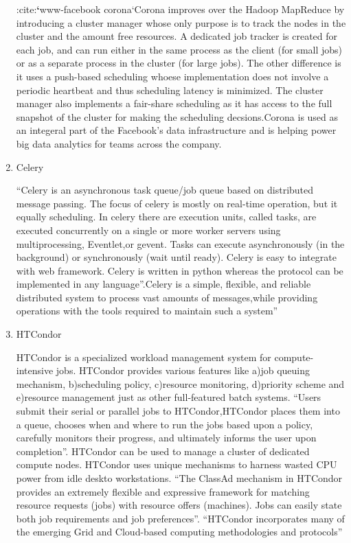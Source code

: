 \begin{enumerate}
:cite:{\color{red}\bfseries{}{}`}www-facebook corona{}`Corona improves over the Hadoop
MapReduce by introducing a cluster manager whose only purpose is
to track the nodes in the cluster and the amount free
resources. A dedicated job tracker is created for each job, and
can run either in the same process as the client (for small jobs)
or as a separate process in the cluster (for large jobs). The
other difference is it uses a push-based scheduling whoese
implementation does not involve a periodic heartbeat and thus
scheduling latency is minimized. The cluster manager also
implements a fair-share scheduling as it has access to the full
snapshot of the cluster for making the scheduling decsions.Corona
is used as an integeral part of the Facebook's data
infrastructure and is helping power big data analytics for teams
across the company.

\item {} 
Celery

``Celery is an asynchronous task queue/job queue based on
distributed message passing.  The focus of celery is mostly on
real-time operation, but it equally scheduling.  In celery there
are execution units, called tasks, are executed concurrently on a
single or more worker servers using multiprocessing, Eventlet,or
gevent.  Tasks can execute asynchronously (in the background) or
synchronously (wait until ready).  Celery is easy to integrate
with web framework. Celery is written in python whereas the
protocol can be implemented in any language''\label{\detokenize{i524/technologies:id517}}{\hyperref[\detokenize{i524/technologies:celery}]{\sphinxcrossref{{[}443{]}}}}.Celery
is a simple, flexible, and reliable distributed system to process
vast amounts of messages,while providing operations with the
tools required to maintain such a system''\label{\detokenize{i524/technologies:id518}}{\hyperref[\detokenize{i524/technologies:celerydocs}]{\sphinxcrossref{{[}444{]}}}}

\item {} 
HTCondor

HTCondor is a specialized workload management system for
compute-intensive jobs.  HTCondor provides various features like
a)job queuing mechanism, b)scheduling policy, c)resource
monitoring, d)priority scheme and e)resource management just as
other full-featured batch systems.  ``Users submit their serial or
parallel jobs to HTCondor,HTCondor places them into a queue,
chooses when and where to run the jobs based upon a policy,
carefully monitors their progress, and ultimately informs the
user upon completion''.  HTCondor can be used to manage a cluster
of dedicated compute nodes. HTCondor uses unique mechanisms to
harness wasted CPU power from idle deskto workstations.  ``The
ClassAd mechanism in HTCondor provides an extremely flexible and
expressive framework for matching resource requests (jobs) with
resource offers (machines).  Jobs can easily state both job
requirements and job preferences''.  ``HTCondor incorporates many
of the emerging Grid and Cloud-based computing methodologies and
protocols''\label{\detokenize{i524/technologies:id519}}{\hyperref[\detokenize{i524/technologies:htcondor}]{\sphinxcrossref{{[}445{]}}}}


\end{enumerate}

